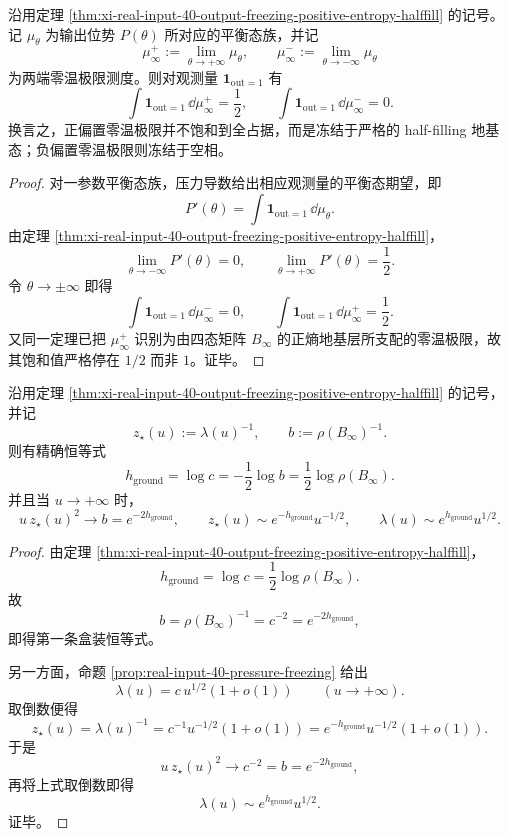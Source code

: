 \begin{corollary}\label{cor:xi-real-input-40-output-freezing-half-filling-empty-phase}
沿用定理 \ref{thm:xi-real-input-40-output-freezing-positive-entropy-halffill} 的记号。记 \(\mu_\theta\) 为输出位势 \(P(\theta)\) 所对应的平衡态族，并记
\[
\mu_\infty^{+}:=\lim_{\theta\to+\infty}\mu_\theta,
\qquad
\mu_\infty^{-}:=\lim_{\theta\to-\infty}\mu_\theta
\]
为两端零温极限测度。则对观测量 \(\mathbf 1_{\mathrm{out}=1}\) 有
\[
\boxed{\;
\int \mathbf 1_{\mathrm{out}=1}\,\dd\mu_\infty^{+}
=
\frac12,\qquad
\int \mathbf 1_{\mathrm{out}=1}\,\dd\mu_\infty^{-}
=
0.\;}
\]
换言之，正偏置零温极限并不饱和到全占据，而是冻结于严格的 half-filling 地基态；负偏置零温极限则冻结于空相。
\end{corollary}
\begin{proof}
对一参数平衡态族，压力导数给出相应观测量的平衡态期望，即
\[
P'(\theta)=\int \mathbf 1_{\mathrm{out}=1}\,\dd\mu_\theta.
\]
由定理 \ref{thm:xi-real-input-40-output-freezing-positive-entropy-halffill}，
\[
\lim_{\theta\to-\infty}P'(\theta)=0,
\qquad
\lim_{\theta\to+\infty}P'(\theta)=\frac12.
\]
令 \(\theta\to\pm\infty\) 即得
\[
\int \mathbf 1_{\mathrm{out}=1}\,\dd\mu_\infty^{-}=0,
\qquad
\int \mathbf 1_{\mathrm{out}=1}\,\dd\mu_\infty^{+}=\frac12.
\]
又同一定理已把 \(\mu_\infty^{+}\) 识别为由四态矩阵 \(B_\infty\) 的正熵地基层所支配的零温极限，故其饱和值严格停在 \(1/2\) 而非 \(1\)。证毕。
\end{proof}

\begin{theorem}\label{thm:xi-real-input-40-ground-entropy-endpoint-square-law}
沿用定理 \ref{thm:xi-real-input-40-output-freezing-positive-entropy-halffill} 的记号，并记
\[
z_\star(u):=\lambda(u)^{-1},
\qquad
b:=\rho(B_\infty)^{-1}.
\]
则有精确恒等式
\[
\boxed{\;
h_{\mathrm{ground}}
=
\log c
=
-\frac12\log b
=
\frac12\log\rho(B_\infty).\;}
\]
并且当 \(u\to+\infty\) 时，
\[
\boxed{\;
u\,z_\star(u)^2\to b=e^{-2h_{\mathrm{ground}}},
\qquad
z_\star(u)\sim e^{-h_{\mathrm{ground}}}u^{-1/2},
\qquad
\lambda(u)\sim e^{h_{\mathrm{ground}}}u^{1/2}.\;}
\]
\end{theorem}
\begin{proof}
由定理 \ref{thm:xi-real-input-40-output-freezing-positive-entropy-halffill}，
\[
h_{\mathrm{ground}}=\log c=\frac12\log\rho(B_\infty).
\]
故
\[
b=\rho(B_\infty)^{-1}=c^{-2}=e^{-2h_{\mathrm{ground}}},
\]
即得第一条盒装恒等式。

另一方面，命题 \ref{prop:real-input-40-pressure-freezing} 给出
\[
\lambda(u)=c\,u^{1/2}(1+o(1))
\qquad(u\to+\infty).
\]
取倒数便得
\[
z_\star(u)=\lambda(u)^{-1}=c^{-1}u^{-1/2}(1+o(1))
=
e^{-h_{\mathrm{ground}}}u^{-1/2}(1+o(1)).
\]
于是
\[
u\,z_\star(u)^2\to c^{-2}=b=e^{-2h_{\mathrm{ground}}},
\]
再将上式取倒数即得
\[
\lambda(u)\sim e^{h_{\mathrm{ground}}}u^{1/2}.
\]
证毕。
\end{proof}

\endinput
